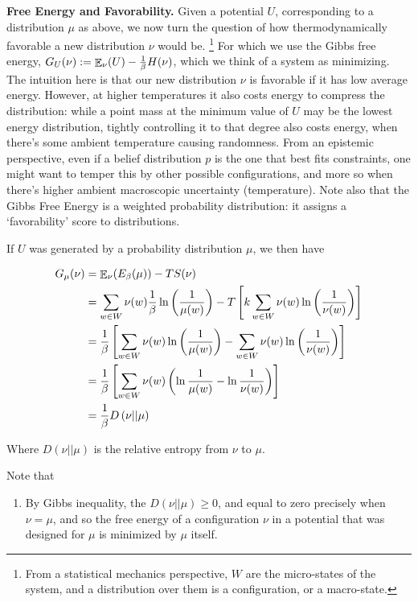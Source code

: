 \documentclass{article}
\numberwithin{equation}{section}
\begin{document}
\begin{notfocus}
	\textbf{Free Energy and Favorability.} Given a potential $U$, corresponding to a distribution $\mu$ as above, we now turn the question of how thermodynamically favorable a new distribution $\nu$ would be.%
		\footnote{From a statistical mechanics perspective, $W$ are the micro-states of the system, and a distribution over them is a configuration, or a macro-state.}
	For which we use the Gibbs free energy, $G_U(\nu) := {\mathop{\mathbb E}}_\nu( U ) - \frac{1}{\beta} H(\nu)$, which we think of a system as minimizing. The intuition here is that our new distribution $\nu$ is favorable if it has low average energy. However, at higher temperatures it also costs energy to compress the distribution: while a point mass at the minimum value of $U$ may be the lowest energy distribution, tightly controlling it to that degree also costs energy, when there's some ambient temperature causing randomness. From an epistemic perspective, even if a belief distribution $p$  is the one that best fits constraints, one might want to temper this by other possible configurations, and more so when there's higher ambient macroscopic uncertainty (temperature). Note also that the Gibbs Free Energy is a weighted probability distribution: it assigns a `favorability' score to distributions.
	
	If $U$ was generated by a probability distribution $\mu$, we then have
	
	\begin{align*}
		G_\mu(\nu) &= {\mathop{\mathbb E}}_\nu( E_\beta(\mu) )  - T S(\nu) \\
		&= \sum_{w \in W}\nu(w) \frac{1}{\beta} \ln \left(\frac{1}{\mu(w)}\right) - T \left[k \sum_{w \in W} \nu(w) \ln \left(\frac{1}{\nu(w)}\right)\right]\\
		&=  \frac{1}{\beta}\left[\sum_{w \in W}\nu(w) \ln \left(\frac{1}{\mu(w)}\right) - \sum_{w \in W} \nu(w) \ln \left(\frac{1}{\nu(w)}\right)\right]\\
		&=  \frac{1}{\beta}\left[\sum_{w \in W}\nu(w) \left(\ln \frac{1}{\mu(w)} - \ln \frac{1}{\nu(w)}\right)\right]\\
		&= \frac{1}{\beta} D \left(\nu || \mu \right)
	\end{align*}

	Where $D(\nu || \mu)$ is the relative entropy from $\nu$ to $\mu$. 
	
	Note that \todo{}
	\begin{enumerate}
		\item By Gibbs inequality, the $D(\nu || \mu) \geq 0$, and equal to zero precisely when $\nu = \mu$, and so the free energy of a configuration $\nu$ in a potential that was designed for $\mu$ is minimized by $\mu$ itself.
		

\end{enumerate}
\end{notfocus}
\end{document}
